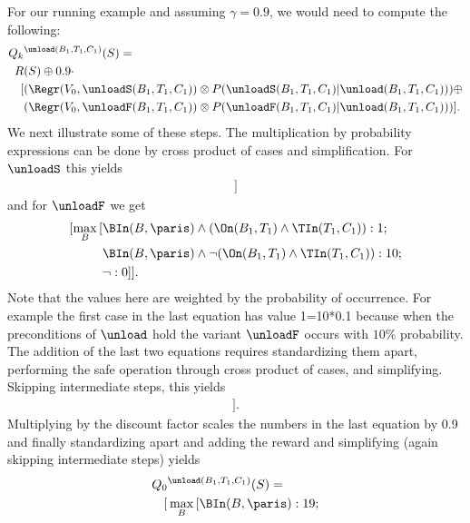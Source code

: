\begin{enumerate}
  For our running example and assuming $\gamma=0.9$, we would need to compute the following:
  \begin{align*}
    Q_k&^{\unload(B_1,T_1,C_1)}(S)  = \\  R&(S) \oplus 0.9 \cdot \\
     [&(\Regr(V_0, \unloadS(B_1,T_1,C_1)) \otimes P(\unloadS(B_1,T_1,C_1) | \unload(B_1,T_1,C_1))) \oplus\\
      &(\Regr(V_0, \unloadF(B_1,T_1,C_1)) \otimes P(\unloadF(B_1,T_1,C_1) | \unload(B_1,T_1,C_1)))].
  \end{align*}
We next illustrate some of these steps. The multiplication by probability expressions can be done by cross product of cases and simplification. For $\unloadS$ this yields
\begin{align*}
  [\max_B \, [ & ((\BIn(B,\paris) \lor ((B_1=B)\land (C_1=\paris))) \\
               &   \land \On(B_1,T_1) \land \TIn(T_1,C_1)): 9; \neg: 0]]
\end{align*}
and for $\unloadF$ we get 
\begin{align*}
%
%
%
%
  [\max_B \, [ & \BIn(B,\paris)   \land (\On(B_1,T_1) \land \TIn(T_1,C_1)): 1;  \\
& \BIn(B,\paris) \land  \neg (\On(B_1,T_1) \land \TIn(T_1,C_1)): 10; \\
& \neg:  0]].
\end{align*}
Note that the values here are weighted by the probability of occurrence. For example the first case in the last equation has value 1=10*0.1 because when the preconditions of $\unload$ hold the variant $\unloadF$ occurs with $10\%$ probability. 
The addition of the last two equations requires standardizing them apart, performing the safe operation through cross product of cases, and simplifying. Skipping intermediate steps, this yields 
  \begin{align*}
[\max_B \, [ & \BIn(B,\paris):10;  \\
  & \neg \BIn(B,\paris) \land (B_1=B)\land (C_1=\paris)  \land \On(B_1,T_1) \land \TIn(T_1,C_1): 9; \\
  & \neg: 0]].
  \end{align*}
Multiplying by the discount factor scales the numbers in the last equation by 0.9 and finally standardizing apart and adding the reward and simplifying (again skipping intermediate steps) yields
  \begin{align*}
Q_0&^{\unload(B_1,T_1,C_1)}(S) = \\
%
%
%
[& \max_B \, [ \BIn(B,\paris):19;  \\

\end{align*}
\end{enumerate}
